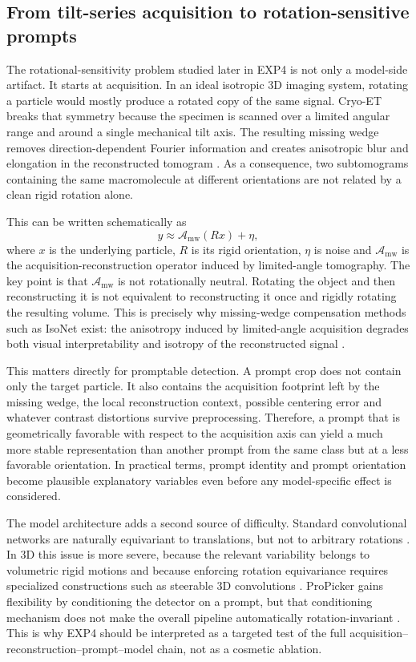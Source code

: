 \documentclass[12pt,a4paper]{report}
\begin{document}
\subsection{From tilt-series acquisition to rotation-sensitive prompts}
\label{sec:rotation-sensitivity}
The rotational-sensitivity problem studied later in EXP4 is not only a model-side artifact. It starts at acquisition. In an ideal isotropic 3D imaging system, rotating a particle would mostly produce a rotated copy of the same signal. Cryo-ET breaks that symmetry because the specimen is scanned over a limited angular range and around a single mechanical tilt axis. The resulting missing wedge removes direction-dependent Fourier information and creates anisotropic blur and elongation in the reconstructed tomogram \cite{lucic2013cryoet,beck2016cryoet}. As a consequence, two subtomograms containing the same macromolecule at different orientations are not related by a clean rigid rotation alone.

This can be written schematically as
\[
  y \approx \mathcal{A}_{\mathrm{mw}}(R x) + \eta,
\]
where \(x\) is the underlying particle, \(R\) is its rigid orientation, \(\eta\) is noise and \(\mathcal{A}_{\mathrm{mw}}\) is the acquisition-reconstruction operator induced by limited-angle tomography. The key point is that \(\mathcal{A}_{\mathrm{mw}}\) is not rotationally neutral. Rotating the object and then reconstructing it is not equivalent to reconstructing it once and rigidly rotating the resulting volume. This is precisely why missing-wedge compensation methods such as IsoNet exist: the anisotropy induced by limited-angle acquisition degrades both visual interpretability and isotropy of the reconstructed signal \cite{liu2022isonet}.

This matters directly for promptable detection. A prompt crop does not contain only the target particle. It also contains the acquisition footprint left by the missing wedge, the local reconstruction context, possible centering error and whatever contrast distortions survive preprocessing. Therefore, a prompt that is geometrically favorable with respect to the acquisition axis can yield a much more stable representation than another prompt from the same class but at a less favorable orientation. In practical terms, prompt identity and prompt orientation become plausible explanatory variables even before any model-specific effect is considered.

The model architecture adds a second source of difficulty. Standard convolutional networks are naturally equivariant to translations, but not to arbitrary rotations \cite{cohen2016gcnn}. In 3D this issue is more severe, because the relevant variability belongs to volumetric rigid motions and because enforcing rotation equivariance requires specialized constructions such as steerable 3D convolutions \cite{weiler2018steerable3d}. ProPicker gains flexibility by conditioning the detector on a prompt, but that conditioning mechanism does not make the overall pipeline automatically rotation-invariant \cite{wiedemann2025propicker}. This is why EXP4 should be interpreted as a targeted test of the full acquisition--reconstruction--prompt--model chain, not as a cosmetic ablation.
\end{document}
